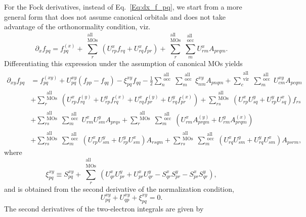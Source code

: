\documentclass[12pt]{article}
\newcommand{\allocc}{\substack{\textrm{all}{}\\\textrm{occ}}}
\newcommand{\allvir}{\substack{\textrm{all}{}\\\textrm{vir}}}
\newcommand{\allmos}{\substack{\textrm{all}{}\\\textrm{MOs}}}
\begin{document}
\vspace{0.2in}
\noindent
For the Fock derivatives, instead of Eq.~\eqref{Eq:dx_f_pq}, we start from a more general form that does not assume
canonical orbitals and does not take advantage of the orthonormality condition, viz.
\begin{equation}
\partial_x f_{pq} = f_{pq}^{(x)} + \sum_r^{\allmos} \left( U_{rp}^x f_{rq} + U_{rq}^x f_{pr} \right) + \sum_r^{\allmos}
\sum_m^{\allocc} U_{rm}^x A_{prqm}.
\end{equation}
Differentiating this expression under the assumption of canonical MOs yields
\begin{align}
\partial_{xy} f_{pq} &= f_{pq}^{(xy)}
+ U_{pq}^{xy} \left(f_{pp} - f_{qq}\right) - \xi_{pq}^{xy} f_{qq}
- \frac{1}{2} \sum_n^{\allocc}\sum_m^{\allocc} \xi_{nm}^{xy} A_{pnqm}
+ \sum_c^{\allvir}\sum_m^{\allocc} U_{cm}^{xy} A_{pcqm}
\nonumber \\
& + \sum_r^{\allmos} \left( U_{rp}^x f_{rq}^{(y)} + U_{rp}^y f_{rq}^{(x)} + U_{rq}^x f_{pr}^{(y)} + U_{rq}^y f_{pr}^{(x)} \right)
+ \sum_{rs}^{\allmos} \left( U_{rp}^x U_{sq}^y + U_{rp}^y U_{sq}^x \right) f_{rs}
\nonumber \\
& + \sum_{rs}^{\allmos}\sum_m^{\allocc} U_{rm}^x U_{sm}^y A_{prqs}
+ \sum_r^{\allmos} \sum_m^{\allocc} \left( U_{rm}^x A_{prqm}^{(y)} + U_{rm}^y A_{prqm}^{(x)} \right)
\nonumber \\
& + \sum_{rs}^{\allmos}\sum_m^{\allocc} \left( U_{rp}^x U_{sm}^y + U_{rp}^y U_{sm}^x \right) A_{rsqm}
+ \sum_{rs}^{\allmos}\sum_m^{\allocc} \left( U_{rq}^x U_{sm}^y + U_{rq}^y U_{sm}^x \right) A_{psrm},
\end{align}
where
\begin{equation}
\xi_{pq}^{xy} \equiv S_{pq}^{xy} + \sum_r^{\allmos} \left( 
U_{qr}^x U_{pr}^y + U_{pr}^x U_{qr}^y - S_{qr}^x S_{pr}^y - S_{pr}^x S_{qr}^y
\right),
\end{equation}
and is obtained from the second derivative of the normalization condition,
\begin{equation}
        U_{pq}^{xy} + U_{qp}^{xy} + \xi_{pq}^{xy} = 0.
\end{equation}
The second derivatives of the two-electron integrals are given by
\end{document}
